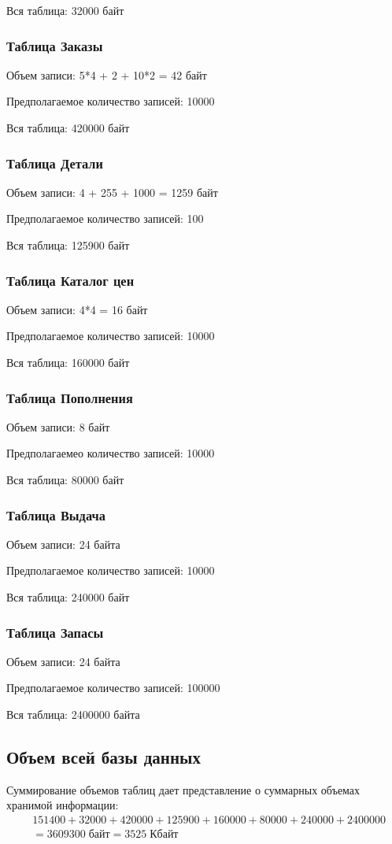 \documentclass[russian,utf8,emptystyle]{eskdtext}
\begin{document}
Вся таблица: 32000 байт

\subsubsection{Таблица Заказы}
Объем записи: 5*4 + 2 + 10*2 = 42 байт

Предполагаемое количество записей: 10000

Вся таблица: 420000 байт

\subsubsection{Таблица Детали}
Объем записи: 4 + 255 + 1000 = 1259 байт

Предполагаемое количество записей: 100

Вся таблица: 125900 байт

\subsubsection{Таблица Каталог цен}
Объем записи: 4*4 = 16 байт

Предполагаемое количество записей: 10000

Вся таблица: 160000 байт

\subsubsection{Таблица Пополнения}
Объем записи: 8 байт

Предполагаемео количество записей: 10000

Вся таблица: 80000 байт

\subsubsection{Таблица Выдача}
Объем записи: 24 байта

Предполагаемое количество записей: 10000

Вся таблица: 240000 байт

\subsubsection{Таблица Запасы}
Объем записи: 24 байта

Предполагаемое количество записей: 100000

Вся таблица: 2400000 байта

\subsection{Объем всей базы данных}
Суммирование объемов таблиц дает представление о суммарных объемах хранимой информации:
\begin{align*}
 & 151400 + 32000 + 420000 + 125900 + 160000 + 80000 + 240000 + 2400000 \\
 & = 3609300 \; \text{байт} = 3525 \; \text{Кбайт}
\end{align*}
\end{document}
